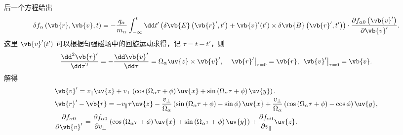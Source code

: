 后一个方程给出
\begin{align*}
	\delta f_\alpha\left( \vb{r},\vb{v},t \right) = -\frac{q_\alpha}{m_\alpha}\int_{-\infty}^t \dd t'\left( \delta\vb{E}\left( \vb{r}',t' \right) + \vb{v}'(t')\times\delta\vb{B}\left( \vb{r}',t' \right) \right)\cdot\frac{\partial f_{\alpha0}\left( \vb{v}' \right)}{\partial \vb{v}'}.
\end{align*}
这里 \(\vb{v}'(t')\) 可以根据匀强磁场中的回旋运动求得，记 \(\tau = t-t'\)，则
\begin{align*}
	\frac{\dd^2 \vb{r}'}{\dd \tau^2} = -\frac{\dd \vb{v}'}{\dd \tau} = \Omega_\alpha \uv{z}\times\vb{v}',\quad
	\left.\vb{r}'\right|_{\tau=0} = \vb{r},\ \left.\vb{v}'\right|_{\tau=0} = \vb{v}.
\end{align*}
解得
\begin{align*}
	&\vb{v}' = v_\parallel \uv{z} + v_\perp\left( \cos\left( \Omega_\alpha\tau+\phi \right)\uv{x} + \sin\left( \Omega_\alpha\tau+\phi \right)\uv{y} \right). \\
	&\vb{r}' - \vb{r} = -v_\parallel \tau \uv{z} - \frac{v_\perp}{\Omega_\alpha}\left( \sin\left( \Omega_\alpha\tau+\phi \right)-\sin\phi \right)\uv{x} + \frac{v_\perp}{\Omega_\alpha}\left( \cos\left( \Omega_\alpha\tau+\phi \right)-\cos\phi \right)\uv{y},\\
	&\frac{\partial f_{\alpha0}}{\partial \vb{v}'} = \frac{\partial f_{\alpha0}}{\partial v_\perp}\left( \cos\left( \Omega_\alpha\tau+\phi \right)\uv{x} + \sin\left( \Omega_\alpha\tau+\phi \right)\uv{y} \right) + \frac{\partial f_{\alpha0}}{\partial v_\parallel}\uv{z}.
\end{align*}


